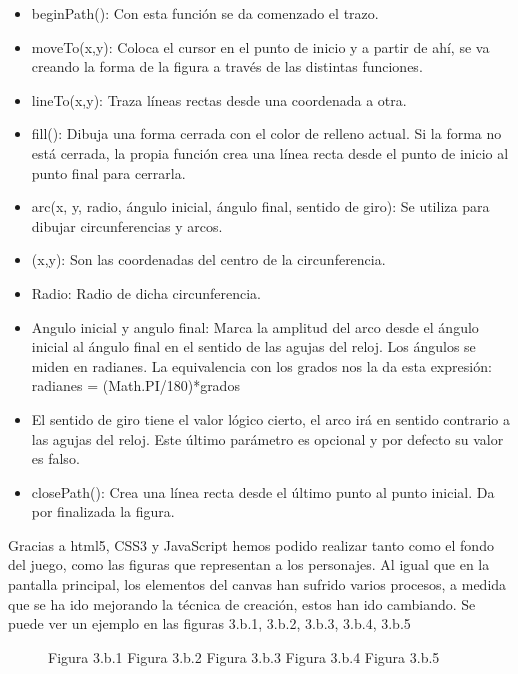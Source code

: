 \begin{itemize}
 \item beginPath():  Con esta función se da comenzado el trazo.
 \item moveTo(x,y): Coloca el cursor en el punto de inicio y a partir de ahí, se va creando la forma de la figura a través de las distintas 
 funciones.
 \item lineTo(x,y): Traza líneas rectas desde una coordenada a otra.
 \item fill(): Dibuja una forma cerrada con el color de relleno actual. Si la forma no está cerrada, la propia función crea una línea recta 
 desde el punto de inicio  al punto final para cerrarla.
 \item arc(x, y, radio, ángulo inicial, ángulo final, sentido de giro):  Se utiliza para dibujar circunferencias y arcos.
 \item (x,y): Son las coordenadas del centro de la circunferencia.
 \item Radio: Radio de dicha circunferencia.
 \item Angulo inicial y angulo final: Marca la amplitud del arco desde el ángulo inicial al ángulo final en el sentido de las agujas del reloj. Los ángulos se miden en radianes. La equivalencia con los grados nos la da esta expresión:
 radianes = (Math.PI/180)*grados
 \item El sentido de giro tiene el valor lógico cierto, el arco irá en sentido contrario a las agujas del reloj. Este último parámetro es 
 opcional y por defecto su valor es falso.
 \item closePath(): Crea una línea recta desde el último punto al punto inicial. Da por finalizada la figura.
\end{itemize}

Gracias a html5, CSS3 y JavaScript hemos podido realizar tanto como el fondo del juego, como las figuras que representan a los personajes.
Al igual que en la pantalla principal, los elementos del canvas han sufrido varios procesos, a medida que se ha ido mejorando la técnica de creación, estos han ido cambiando.
Se puede ver un ejemplo en las figuras 3.b.1, 3.b.2, 3.b.3, 3.b.4, 3.b.5

\begin{figure}[p]
Figura 3.b.1
Figura 3.b.2
Figura 3.b.3
Figura 3.b.4
Figura 3.b.5
\end{figure}
